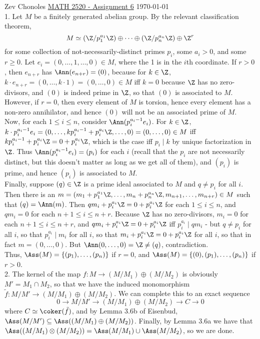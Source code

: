 \documentclass[11pt]{article}
\begin{document}
Zev Chonoles \hfill 
\underline{MATH 2520 - Assignment 6} \hfill \today\\

\num{1.} Let $M$ be a finitely generated abelian group. By the relevant classification theorem,
\[M\simeq (\Z/p_1^{a_1}\Z)\oplus\cdots\oplus(\Z/p_n^{a_n}\Z)\oplus\Z^r\]
for some collection of not-necessarily-distinct primes $p_i$, some $a_i>0$, and some $r\geq 0$. Let $e_i=(0,\ldots,1,\ldots,0)\in M$, where the 1 is in the $i$th coordinate. If $r>0$, then $e_{n+r}$ has $\Ann(e_{n+r})=(0)$, because for $k\in\Z$, $k\cdot e_{n+r}=(0,\ldots,k\cdot1)=(0,\ldots,0)\in M$ iff $k=0$ because $\Z$ has no zero-divisors, and $(0)$ is indeed prime in $\Z$, so that $(0)$ is associated to $M$. However, if $r=0$, then every element of $M$ is torsion, hence every element has a non-zero annihilator, and hence $(0)$ will not be an associated prime of $M$. \\

Now, for each $1\leq i\leq n$, consider $\Ann(p_i^{a_i-1}e_i)$. For $k\in\Z$, $k\cdot p_i^{a_i-1}e_i=(0,\ldots,kp_i^{a_i-1}+p_i^{a_i}\Z,\ldots,0)=(0,\ldots,0)\in M$ iff $kp_i^{a_i-1}+p_i^{a_i}\Z=0+p_i^{a_i}\Z$, which is the case iff $p_i\mid k$ by unique factorization in $\Z$. Thus $\Ann(p_i^{a_i-1}e_i)=(p_i)$ for each $i$ (recall that the $p_i$ are not necessarily distinct, but this doesn't matter as long as we get all of them), and $(p_i)$ is prime, and hence $(p_i)$ is associated to $M$.\\

Finally, suppose $(q)\in\Z$ is a prime ideal associated to $M$ and $q\neq p_i$ for all $i$. Then there is an $m=(m_1+p_1^{a_1}\Z,\ldots,m_n+p_n^{a_n}\Z,m_{n+1},\ldots,m_{n+r})\in M$ such that $(q)=\Ann(m)$. Then $qm_i+p_i^{a_i}\Z=0+p_i^{a_i}\Z$ for each $1\leq i\leq n$, and $qm_i=0$ for each $n+1\leq i\leq n+r$. Because $\Z$ has no zero-divisors, $m_i=0$ for each $n+1\leq i\leq n+r$, and $qm_i+p_i^{a_i}\Z=0+p_i^{a_i}\Z$ iff $p_i^{a_i}\mid qm_i$ - but $q\neq p_i$ for all $i$, so that $p_i^{a_i}\mid m_i$ for all $i$, so that $m_i+p_i^{a_i}\Z=0+p_i^{a_i}\Z$ for all $i$, so that in fact $m=(0,\ldots,0)$. But $\Ann(0,\ldots,0)=\Z\neq(q)$, contradiction.\\

Thus, $\Ass(M)=\{(p_1),\ldots,(p_n)\}$ if $r=0$, and $\Ass(M)=\{(0),(p_1),\ldots,(p_n)\}$ if $r>0$.\\

\num{2.} The kernel of the map $f:M\rightarrow (M/M_1)\oplus(M/M_2)$ is obviously $M'=M_1\cap M_2$, so that we have the induced monomorphism $\tilde{f}:M/M'\rightarrow(M/M_1)\oplus(M/M_2)$. We can complete this to an exact sequence 
\[0\rightarrow M/M'\rightarrow (M/M_1)\oplus(M/M_2)\rightarrow C\rightarrow 0\]
where $C\simeq\coker(\tilde{f})$, and by Lemma 3.6b of Eisenbud, $\Ass(M/M')\subseteq\Ass((M/M_1)\oplus(M/M_2))$. Finally, by Lemma 3.6a we have that $\Ass((M/M_1)\otimes(M/M_2))=\Ass(M/M_1)\cup\Ass(M/M_2)$, so we are done.      \\
\end{document}
